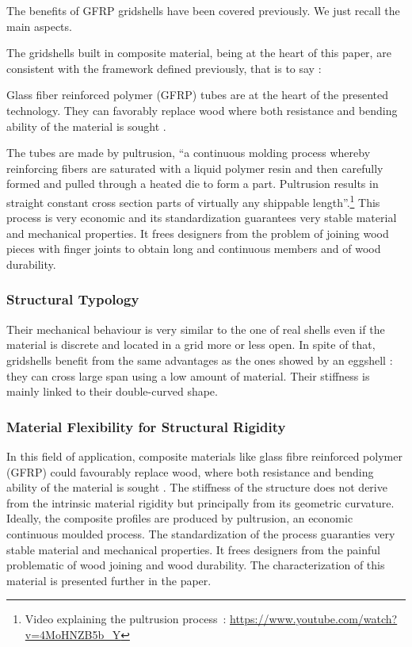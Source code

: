 The benefits of GFRP gridshells have been covered previously. We just recall the main aspects.

The gridshells built in composite material, being at the heart of this paper, are consistent with the framework defined previously, that is to say :


Glass fiber reinforced polymer (GFRP) tubes are at the heart of the presented technology. They can favorably replace wood where both resistance and bending ability of the material is sought \cite{Douthe2010}. 

The tubes are made by pultrusion, \enquote{a continuous molding process whereby reinforcing fibers are saturated with a liquid polymer resin and then carefully formed and pulled through a heated die to form a part. Pultrusion results in straight constant cross section parts of virtually any shippable length}.\footnote{Video explaining the pultrusion process~: \url{https://www.youtube.com/watch?v=4MoHNZB5b_Y}} This process is very economic and its standardization guarantees very stable material and mechanical properties. It frees designers from the problem of joining wood pieces with finger joints to obtain long and continuous members and of wood durability. 


\subsubsection{Structural Typology}
Their mechanical behaviour is very similar to the one of real shells even if the material is discrete and located in a grid more or less open. In spite of that, gridshells benefit from the same advantages as the ones showed by an eggshell : they can cross large span using a low amount of material. Their stiffness is mainly linked to their double-curved shape.


\subsubsection{Material Flexibility for Structural Rigidity}
In this field of application, composite materials like glass fibre reinforced polymer (GFRP) could favourably replace wood, where both resistance and bending ability of the material is sought \citep{Douthe2010}. The stiffness of the structure does not derive from the intrinsic material rigidity but principally from its geometric curvature. Ideally, the composite profiles are produced by pultrusion, an economic continuous moulded process. The standardization of the process guaranties very stable material and mechanical properties. It frees designers from the painful problematic of wood joining and wood durability. The characterization of this material is presented further in the paper.


